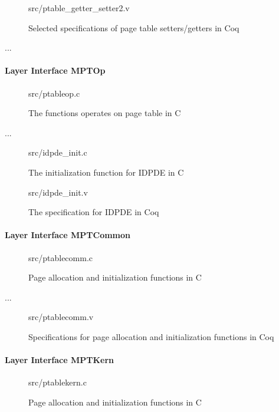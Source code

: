 \begin{figure}
	 {src/ptable_getter_setter2.v}
	\caption{Selected specifications of page table setters/getters in Coq}
	\label{fig:ptable_getter_setter2_v}
\end{figure}

...

\paragraph{Layer Interface MPTOp}

\begin{figure}
	 {src/ptableop.c}
	\caption{The functions operates on page table in C}
	\label{fig:ptable_op_c}
\end{figure}

...


\begin{figure}
	 {src/idpde_init.c}
	\caption{The initialization function for IDPDE in C}
	\label{fig:idpde_init_c}
\end{figure}

\begin{figure}
	 {src/idpde_init.v}
	\caption{The specification for IDPDE in Coq}
	\label{fig:idpde_init_v}
\end{figure}

\paragraph{Layer Interface MPTCommon}

\begin{figure}
	 {src/ptablecomm.c}
	\caption{Page allocation and initialization functions in C}
	\label{fig:ptablecomm_c}
\end{figure}

...

\begin{figure}
	 {src/ptablecomm.v}
	\caption{Specifications for page allocation and initialization functions in Coq}
	\label{fig:ptablecomm_v}
\end{figure}

\paragraph{Layer Interface MPTKern}

\begin{figure}
	 {src/ptablekern.c}
	\caption{Page allocation and initialization functions in C}
	\label{fig:ptablekern_c}
\end{figure}

